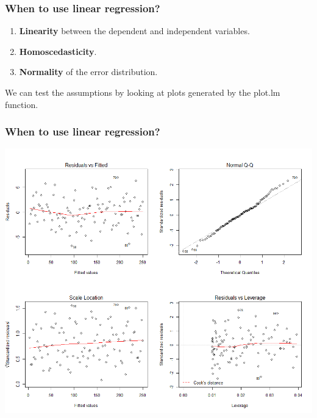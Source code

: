 \documentclass{beamer}
\begin{document}
\begin{frame}
\frametitle{When to use linear regression?}
\begin{enumerate}
\item \textbf{Linearity} between the dependent and independent variables.
\item \textbf{Homoscedasticity}.
\item \textbf{Normality} of the error distribution.
\end{enumerate}

We can test the assumptions by looking at plots generated by the plot.lm function.
\end{frame}

\begin{frame}
\frametitle{When to use linear regression?}
\includegraphics[width=\linewidth,height=\textheight,keepaspectratio=true]{lmplot.png}
\end{frame}
 
\end{document}
